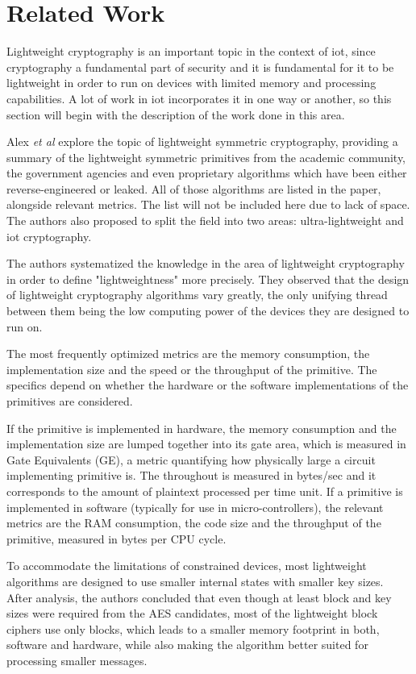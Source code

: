 \documentclass{llncs}
\begin{document}
\section{Related Work}

Lightweight cryptography is an important topic in the context of \gls{iot}, since
cryptography a fundamental part of security and it is fundamental for it to be
lightweight in order to run on devices with limited memory and processing
capabilities. A lot of work in \gls{iot} incorporates it in one way or another,
so this section will begin with the description of the work done in this area.

Alex \textit{et al}\cite{Stateoft96:online} explore the topic of lightweight symmetric cryptography,
providing a summary of the lightweight symmetric
primitives from the academic community, the government agencies and even proprietary
algorithms which have been either reverse-engineered or leaked. All of those algorithms
are listed in the paper, alongside relevant metrics. The list will not be
included here due to lack of space. The authors also proposed
to split the field into two areas: ultra-lightweight and \gls{iot} cryptography.

The authors systematized the knowledge in the area of lightweight cryptography
in order to define "lightweightness" more precisely. They observed that the design
of lightweight cryptography algorithms vary greatly, the only unifying thread
between them being the low computing power of the devices they are designed to run on.

The most frequently optimized metrics are the memory consumption, the implementation size
and the speed or the throughput of the primitive. The specifics depend on whether
the hardware or the software implementations of the primitives are considered.

If the primitive is implemented in hardware, the memory consumption and the implementation
size are lumped together into its gate area, which is measured in Gate Equivalents (GE),
a metric quantifying how physically large a circuit implementing primitive is.
The throughout is measured in bytes/sec and it corresponds to the amount of plaintext
processed per time unit. If a primitive is implemented in software (typically for
use in micro-controllers), the relevant metrics are the RAM consumption, the code
size and the throughput of the primitive, measured in bytes per CPU cycle.

To accommodate the limitations of constrained devices, most lightweight algorithms
are designed to use smaller internal states with smaller key sizes. After analysis,
the authors concluded that even though at least  block and
key sizes were required from the AES candidates, most of the lightweight
block ciphers use only  blocks, which leads to a smaller memory
footprint in both, software and hardware, while also making the algorithm better suited
for processing smaller messages.
\end{document}
